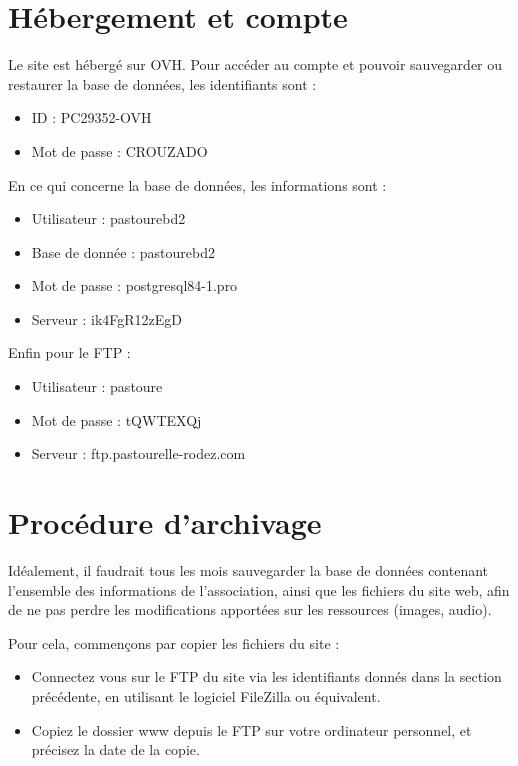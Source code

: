 \documentclass[11pt]{report}
\begin{document}
\section{Hébergement et compte}
Le site est hébergé sur OVH. Pour accéder au compte et pouvoir sauvegarder ou
restaurer la base de données, les identifiants sont : \\
\begin{itemize}
  \item ID : PC29352-OVH
  \item Mot de passe : CROUZADO \\
\end{itemize}

\par En ce qui concerne la base de données, les informations sont : \\
\begin{itemize}
  \item Utilisateur : pastourebd2
  \item Base de donnée : pastourebd2
  \item Mot de passe :  postgresql84-1.pro
  \item Serveur : ik4FgR12zEgD \\
\end{itemize}

\par Enfin pour le FTP : \\
\begin{itemize}
  \item Utilisateur : pastoure
  \item Mot de passe :  tQWTEXQj
  \item Serveur : ftp.pastourelle-rodez.com
\end{itemize}


\section{Procédure d'archivage}
Idéalement, il faudrait tous les mois sauvegarder la base de données contenant
l'ensemble des informations de l'association, ainsi que les fichiers du site
web, afin de ne pas perdre les modifications apportées sur les ressources
(images, audio).

Pour cela, commençons par copier les fichiers du site  : 
\begin{itemize}
  \item Connectez vous sur le FTP du site via les identifiants donnés dans la
  section précédente, en utilisant le logiciel FileZilla ou équivalent.
  \item Copiez le dossier \og www \fg{} depuis le FTP sur votre ordinateur
  personnel, et précisez la date de la copie. \\
\end{itemize}
\end{document}
